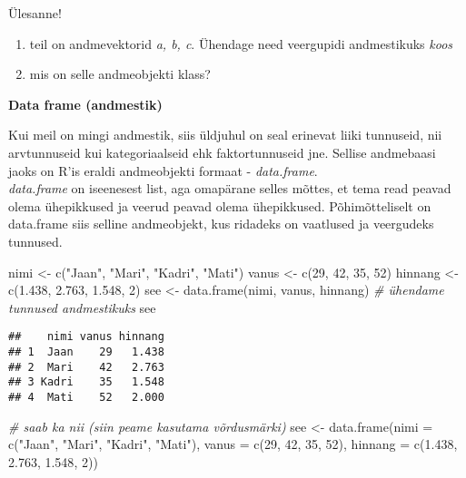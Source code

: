 \documentclass[
]{book}
\newenvironment{Shaded}{\begin{snugshade}}{\end{snugshade}}
\newcommand{\AttributeTok}[1]{\textcolor[rgb]{0.77,0.63,0.00}{#1}}
\newcommand{\CommentTok}[1]{\textcolor[rgb]{0.56,0.35,0.01}{\textit{#1}}}
\newcommand{\DecValTok}[1]{\textcolor[rgb]{0.00,0.00,0.81}{#1}}
\newcommand{\FloatTok}[1]{\textcolor[rgb]{0.00,0.00,0.81}{#1}}
\newcommand{\FunctionTok}[1]{\textcolor[rgb]{0.00,0.00,0.00}{#1}}
\newcommand{\NormalTok}[1]{#1}
\newcommand{\OtherTok}[1]{\textcolor[rgb]{0.56,0.35,0.01}{#1}}
\newcommand{\StringTok}[1]{\textcolor[rgb]{0.31,0.60,0.02}{#1}}
\providecommand{\tightlist}{%
  \setlength{\itemsep}{0pt}\setlength{\parskip}{0pt}}
\begin{document}
Ülesanne!

\begin{enumerate}
\def\labelenumi{\arabic{enumi}.}
\tightlist
\item
  teil on andmevektorid \emph{a, b, c}. Ühendage need veergupidi andmestikuks \emph{koos}
\item
  mis on selle andmeobjekti klass?
\end{enumerate}

\textbf{Data frame (andmestik)}

Kui meil on mingi andmestik, siis üldjuhul on seal erinevat liiki tunnuseid, nii arvtunnuseid kui kategoriaalseid ehk faktortunnuseid jne. Sellise andmebaasi jaoks on R'is eraldi andmeobjekti formaat - \emph{data.frame}.\\
\emph{data.frame} on iseenesest list, aga omapärane selles mõttes, et tema read peavad olema ühepikkused ja veerud peavad olema ühepikkused. Põhimõtteliselt on data.frame siis selline andmeobjekt, kus ridadeks on vaatlused ja veergudeks tunnused.

\begin{Shaded}
\begin{Highlighting}[]
\NormalTok{nimi }\OtherTok{\textless{}{-}} \FunctionTok{c}\NormalTok{(}\StringTok{"Jaan"}\NormalTok{, }\StringTok{"Mari"}\NormalTok{, }\StringTok{"Kadri"}\NormalTok{, }\StringTok{"Mati"}\NormalTok{)}
\NormalTok{vanus }\OtherTok{\textless{}{-}} \FunctionTok{c}\NormalTok{(}\DecValTok{29}\NormalTok{, }\DecValTok{42}\NormalTok{, }\DecValTok{35}\NormalTok{, }\DecValTok{52}\NormalTok{)}
\NormalTok{hinnang }\OtherTok{\textless{}{-}} \FunctionTok{c}\NormalTok{(}\FloatTok{1.438}\NormalTok{, }\FloatTok{2.763}\NormalTok{, }\FloatTok{1.548}\NormalTok{, }\DecValTok{2}\NormalTok{)}
\NormalTok{see }\OtherTok{\textless{}{-}} \FunctionTok{data.frame}\NormalTok{(nimi, vanus, hinnang) }\CommentTok{\# ühendame tunnused andmestikuks}
\NormalTok{see}
\end{Highlighting}
\end{Shaded}

\begin{verbatim}
##    nimi vanus hinnang
## 1  Jaan    29   1.438
## 2  Mari    42   2.763
## 3 Kadri    35   1.548
## 4  Mati    52   2.000
\end{verbatim}

\begin{Shaded}
\begin{Highlighting}[]
\CommentTok{\# saab ka nii (siin peame kasutama võrdusmärki)}
\NormalTok{see }\OtherTok{\textless{}{-}} \FunctionTok{data.frame}\NormalTok{(}\AttributeTok{nimi =} \FunctionTok{c}\NormalTok{(}\StringTok{"Jaan"}\NormalTok{, }\StringTok{"Mari"}\NormalTok{, }\StringTok{"Kadri"}\NormalTok{, }\StringTok{"Mati"}\NormalTok{),}
                  \AttributeTok{vanus =} \FunctionTok{c}\NormalTok{(}\DecValTok{29}\NormalTok{, }\DecValTok{42}\NormalTok{, }\DecValTok{35}\NormalTok{, }\DecValTok{52}\NormalTok{),}
                  \AttributeTok{hinnang =} \FunctionTok{c}\NormalTok{(}\FloatTok{1.438}\NormalTok{, }\FloatTok{2.763}\NormalTok{, }\FloatTok{1.548}\NormalTok{, }\DecValTok{2}\NormalTok{))}
\end{Highlighting}
\end{Shaded}
\end{document}
